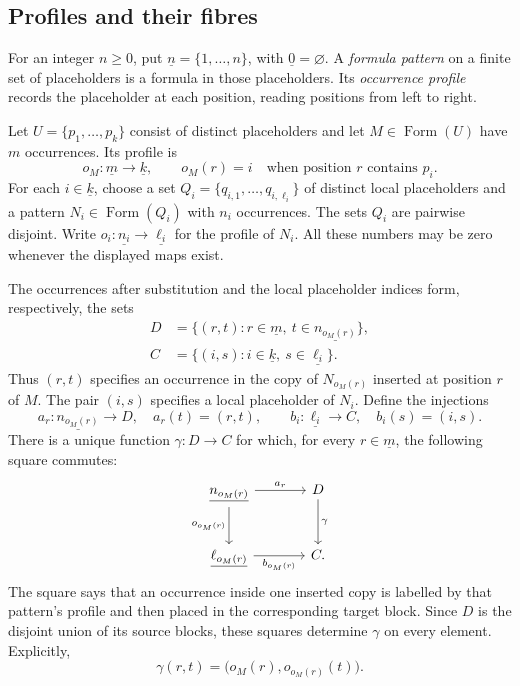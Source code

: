 \documentclass[11pt]{article}
\newcommand{\FormulaSet}{\operatorname{Form}}
\begin{document}
\subsection{Profiles and their fibres}\label{app:profiles}

For an integer $n\geq0$, put $\underline n=\{1,\ldots,n\}$, with
$\underline0=\varnothing$. A \emph{formula pattern} on a finite set
of placeholders is a formula in those placeholders. Its
\emph{occurrence profile} records the placeholder at each position,
reading positions from left to right.

Let $U=\{p_1,\ldots,p_k\}$ consist of distinct placeholders and let
$M\in\FormulaSet(U)$ have $m$ occurrences. Its profile is
\[
 o_M:\underline m\longrightarrow\underline k,
 \qquad o_M(r)=i\quad\text{when position $r$ contains $p_i$}.
\]
For each $i\in\underline k$, choose a set
$Q_i=\{q_{i,1},\ldots,q_{i,\ell_i}\}$ of distinct local placeholders and a
pattern $N_i\in\FormulaSet(Q_i)$ with $n_i$ occurrences. The sets
$Q_i$ are pairwise disjoint. Write
$o_i:\underline{n_i}\to\underline{\ell_i}$ for the profile of $N_i$.
All these numbers may be zero whenever the displayed maps exist.

The occurrences after substitution and the local placeholder indices
form, respectively, the sets
\[
 \begin{aligned}
 D&=\{(r,t):r\in\underline m,\ t\in\underline{n_{o_M(r)}}\},\\
 C&=\{(i,s):i\in\underline k,\ s\in\underline{\ell_i}\}.
 \end{aligned}
\]
Thus $(r,t)$ specifies an occurrence in the copy of $N_{o_M(r)}$
inserted at position $r$ of $M$. The pair $(i,s)$ specifies a local
placeholder of $N_i$. Define the injections
\[
 a_r:\underline{n_{o_M(r)}}\longrightarrow D,\quad a_r(t)=(r,t),
 \qquad
 b_i:\underline{\ell_i}\longrightarrow C,\quad b_i(s)=(i,s).
\]
There is a unique function $\gamma:D\to C$ for which, for every
$r\in\underline m$, the following square commutes:
\begin{equation}\label{eq:app-fibre}
\begin{tikzcd}[column sep=large,row sep=large]
 \underline{n_{o_M(r)}}\arrow[r,"a_r"]\arrow[d,"o_{o_M(r)}"']
   &D\arrow[d,"\gamma"]\\
 \underline{\ell_{o_M(r)}}\arrow[r,"b_{o_M(r)}"']&C.
\end{tikzcd}
\end{equation}
The square says that an occurrence inside one inserted copy is labelled
by that pattern's profile and then placed in the corresponding target
block. Since $D$ is the disjoint union of its source blocks, these
squares determine $\gamma$ on every element. Explicitly,
\[
 \gamma(r,t)=\bigl(o_M(r),o_{o_M(r)}(t)\bigr).
\]
\end{document}
